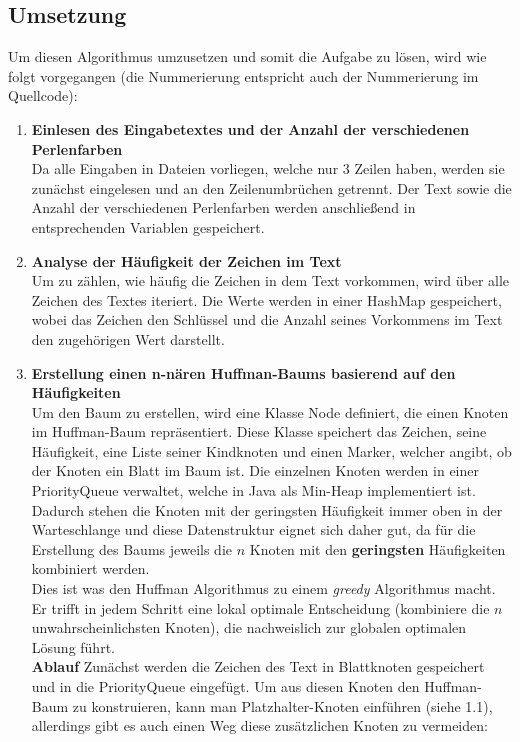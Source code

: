 \documentclass[a4paper,10pt,ngerman]{scrartcl}
\begin{document}
\subsection{Umsetzung}

Um diesen Algorithmus umzusetzen und somit die Aufgabe zu lösen, wird wie folgt vorgegangen (die Nummerierung entspricht auch der Nummerierung im Quellcode): 
\begin{enumerate}
  \item \textbf{Einlesen des Eingabetextes und der Anzahl der verschiedenen Perlenfarben} \\
  Da alle Eingaben in Dateien vorliegen, welche nur 3 Zeilen haben, werden sie zunächst eingelesen und an den Zeilenumbrüchen getrennt. Der Text sowie die Anzahl der verschiedenen Perlenfarben werden anschließend in entsprechenden Variablen gespeichert. 
  \item \textbf{Analyse der Häufigkeit der Zeichen im Text} \\
  Um zu zählen, wie häufig die Zeichen in dem Text vorkommen, wird über alle Zeichen des Textes iteriert. Die Werte werden in einer HashMap gespeichert, wobei das Zeichen den Schlüssel und die Anzahl seines Vorkommens im Text den zugehörigen Wert darstellt. 
  \item \textbf{Erstellung einen n-nären Huffman-Baums basierend auf den Häufigkeiten} \\
  Um den Baum zu erstellen, wird eine Klasse Node definiert, die einen Knoten im Huffman-Baum repräsentiert. Diese Klasse speichert das Zeichen, seine Häufigkeit, eine Liste seiner Kindknoten und einen Marker, welcher angibt, ob der Knoten ein Blatt im Baum ist. Die einzelnen Knoten werden in einer PriorityQueue verwaltet, welche in Java als Min-Heap implementiert ist. Dadurch stehen die Knoten mit der geringsten Häufigkeit immer oben in der Warteschlange und diese Datenstruktur eignet sich daher gut, da für die Erstellung des Baums jeweils die $n$ Knoten mit den \textbf{geringsten} Häufigkeiten kombiniert werden.\\
  Dies ist was den Huffman Algorithmus zu einem \textit{greedy} Algorithmus macht. Er trifft in jedem Schritt eine lokal optimale Entscheidung (kombiniere die $n$ unwahrscheinlichsten Knoten), die nachweislich zur globalen optimalen Lösung führt.\\
  \newline
  \textbf{Ablauf}
  \newline
  Zunächst werden die Zeichen des Text in Blattknoten gespeichert und in die PriorityQueue eingefügt. Um aus diesen Knoten den Huffman-Baum zu konstruieren, kann man Platzhalter-Knoten einführen (siehe 1.1), allerdings gibt es auch einen Weg diese zusätzlichen Knoten zu vermeiden: \\

\end{enumerate}
\end{document}
